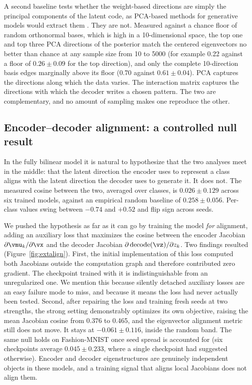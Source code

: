 \documentclass[10pt]{article} %
\begin{document}
A second baseline tests whether the weight-based directions are simply the
principal components of the latent code, as PCA-based methods for generative models
would extract them \citep{harkonen2020ganspace}. They are not. Measured against a
chance floor of random orthonormal bases, which is high in a 10-dimensional space,
the top one and top three PCA directions of the posterior match the centered
eigenvectors no better than chance at any sample size from 10 to 5000 (for example
0.22 against a floor of $0.26 \pm 0.09$ for the top direction), and only the
complete 10-direction basis edges marginally above its floor (0.70 against
$0.61 \pm 0.04$). PCA captures the directions along which the data varies. The
interaction matrix captures the directions with which the decoder writes a chosen
pattern. The two are complementary, and no amount of sampling makes one reproduce
the other.

\subsection{Encoder--decoder alignment: a controlled null result}
\label{sec:alignment}

In the fully bilinear model it is natural to hypothesize that the two analyses meet
in the middle: that the latent direction the encoder uses to represent a class
aligns with the latent direction the decoder uses to generate it. It does not. The
measured cosine between the two, averaged over classes, is $0.026 \pm 0.129$ across
six trained models, against an empirical random baseline of $0.258 \pm 0.056$.
Per-class values swing between $-0.74$ and $+0.52$ and flip sign across seeds.

We pushed the hypothesis as far as it can go by training the model \emph{for}
alignment, adding an auxiliary loss that maximizes the cosine between the encoder
Jacobian $\partial \vmu_k / \partial \vx$ and the decoder Jacobian
$\partial \, \mathrm{decode}(\vz) / \partial z_k$. Two findings resulted
(Figure~\ref{fig:extalign}). First, the initial implementation of this loss
computed both Jacobians outside the computation graph and therefore contributed
zero gradient. The checkpoint trained with it is indistinguishable from an
unregularized one. We mention this because silently detached auxiliary losses are
an easy failure mode to miss, and because it means the loss had never actually been
tested. Second, after repairing the loss and training fresh seeds at two strengths,
the strong setting demonstrably optimizes its own objective, raising the mean
Jacobian cosine from 0.376 to 0.465, and the eigenvector alignment metric still
does not move. It stays at $-0.061 \pm 0.116$, inside the random band. The same
null holds on Fashion-MNIST once seed spread is accounted for (six checkpoints
average $0.045 \pm 0.233$, where a single checkpoint had suggested otherwise).
Encoder and decoder eigenstructures are genuinely independent objects in these
models, and a training signal that aligns local Jacobians does not align them.
\end{document}
